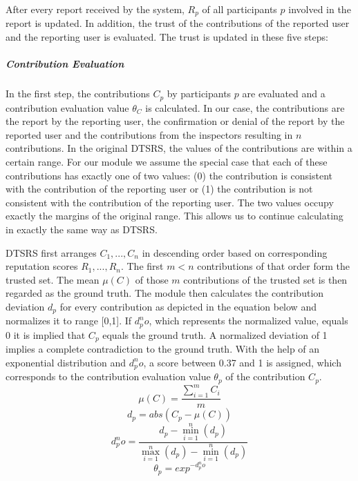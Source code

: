 \documentclass[
a4paper,     %
titlepage,   %
14pt         %
]{scrartcl}  %
\theoremstyle{mystyle}
\begin{document}
After every report received by the system, $R_p$ of all participants $p$ involved in the report is updated. In addition, the trust of the contributions of the reported user and the reporting user is evaluated. The trust is updated in these five steps:

\subparagraph{Contribution Evaluation}In the first step, the contributions $C_p$ by participants $p$ are evaluated and a contribution evaluation value $\theta_C $ is calculated. In our case, the contributions are the report by the reporting user, the confirmation or denial of the report by the reported user and the contributions from the inspectors resulting in $n$ contributions. In the original DTSRS, the values of the contributions are within a certain range. For our module we assume the special case that each of these contributions has exactly one of two values: (0) the contribution is consistent with the contribution of the reporting user or (1) the contribution is not consistent with the contribution of the reporting user. The two values occupy exactly the margins of the original range. This allows us to continue calculating in exactly the same way as DTSRS.

DTSRS first arranges ${C_1, ..., C_n}$ in descending order based on corresponding reputation scores ${R_1, ..., R_n}$. The first $m<n$ contributions of that order form the trusted set. The mean $\mu(C)$ of those $m$ contributions of the trusted set is then regarded as the ground truth. The module then calculates the contribution deviation $d_p$ for every contribution as depicted in the equation below and normalizes it to range [0,1].  If $d_p^no$, which represents the normalized value, equals 0 it is implied that $C_p$ equals the ground truth. A normalized deviation of 1 implies a complete contradiction to the ground truth. With the help of an exponential distribution and $d_p^no$, a score between 0.37 and 1 is assigned, which corresponds to the contribution evaluation value $\theta_p $ of the contribution $C_p$.\\

\begin{equation}
  \mu(C)= \frac{\sum_{i=1}^{m} C_i}{m}
\end{equation}
\begin{equation}
  d_p = abs(C_p - \mu(C))
\end{equation}
\begin{equation}
  d_p^no = \frac{d_p-\min_{i=1}^{n}(d_p)}{\max_{i=1}^{n}(d_p) - \min_{i=1}^{n}(d_p)}
\end{equation}
\begin{equation}
  \theta_p = exp^{-d_p^no}
\end{equation}
\end{document}
